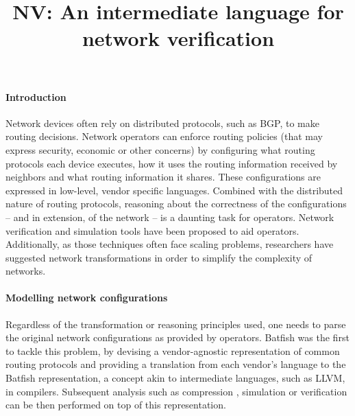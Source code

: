 \documentclass[sigconf,10pt]{acmart}
\begin{document}
\title{NV: An intermediate language for network verification}


\maketitle

%
%
%
%

\paragraph{Introduction} 

Network devices often rely on distributed protocols, such as BGP, to
make routing decisions. Network operators can enforce routing policies
(that may express security, economic or other concerns) by configuring
what routing protocols each device executes, how it uses the routing
information received by neighbors and what routing information it
shares. These configurations are expressed in low-level, vendor
specific languages. Combined with the distributed nature of routing
protocols, reasoning about the correctness of the configurations --
and in extension, of the network -- is a daunting task for operators.
Network verification \cite{minesweeper,arc} and simulation tools
\cite{batfish} have been proposed to aid operators. Additionally, as
those techniques often face scaling problems, researchers have
suggested network transformations \cite{bonsai, origami} in order to
simplify the complexity of networks.

\paragraph{Modelling network configurations}
Regardless of the transformation or reasoning principles used, one
needs to parse the original network configurations as provided by
operators. Batfish \cite{batfish} was the first to tackle this
problem, by devising a vendor-agnostic representation of common
routing protocols and providing a translation from each vendor's
language to the Batfish representation, a concept akin to intermediate
languages, such as LLVM, in compilers. Subsequent analysis such as
compression \cite{bonsai}, simulation \cite{batfish} or verification
\cite{minesweeper,arc} can be then performed on top of this
representation.
\end{document}
